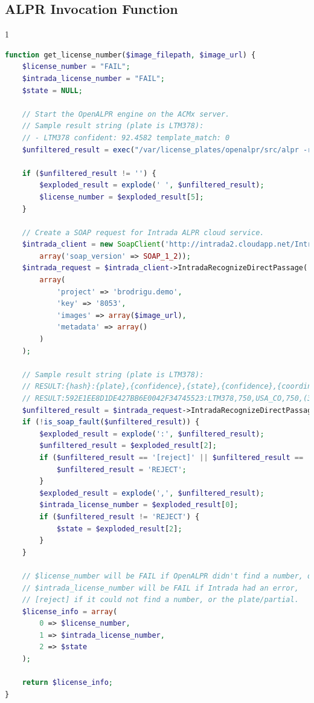 \documentclass[11pt, oneside, fullpage, doublespace]{article}
\begin{document}
\subsection*{ALPR Invocation Function}
\begin{spacing}{1}
\begin{lstlisting}[language=php]
function get_license_number($image_filepath, $image_url) {
	$license_number = "FAIL";
	$intrada_license_number = "FAIL";
	$state = NULL;

	// Start the OpenALPR engine on the ACMx server.
	// Sample result string (plate is LTM378):
	// - LTM378 confident: 92.4582 template_match: 0
	$unfiltered_result = exec("/var/license_plates/openalpr/src/alpr -r /var/license_plates/openalpr/runtime_data -n 1 $image_filepath");

	if ($unfiltered_result != '') {
		$exploded_result = explode(' ', $unfiltered_result);
		$license_number = $exploded_result[5];
	}

	// Create a SOAP request for Intrada ALPR cloud service.
	$intrada_client = new SoapClient('http://intrada2.cloudapp.net/IntradaService.asmx?WSDL',
		array('soap_version' => SOAP_1_2));
	$intrada_request = $intrada_client->IntradaRecognizeDirectPassage(
		array(
			'project' => 'brodrigu.demo',
			'key' => '8053',
			'images' => array($image_url),
			'metadata' => array()
		)
	);

	// Sample result string (plate is LTM378):
	// RESULT:{hash}:{plate},{confidence},{state},{confidence},{coordinates of license plate in image}:{execution time}
	// RESULT:592E1EE8D1DE427BB6E0042F34745523:LTM378,750,USA_CO,750,(309,156),(503,159),(309,206),(503,207):1594
	$unfiltered_result = $intrada_request->IntradaRecognizeDirectPassageResult;
	if (!is_soap_fault($unfiltered_result)) {
		$exploded_result = explode(':', $unfiltered_result);
		$unfiltered_result = $exploded_result[2];
		if ($unfiltered_result == '[reject]' || $unfiltered_result == 'Could not download file') {
			$unfiltered_result = 'REJECT';
		}
		$exploded_result = explode(',', $unfiltered_result);
		$intrada_license_number = $exploded_result[0];
		if ($unfiltered_result != 'REJECT') {
			$state = $exploded_result[2];
		}
	}

	// $license_number will be FAIL if OpenALPR didn't find a number, or the plate/partial.
	// $intrada_license_number will be FAIL if Intrada had an error,
	// [reject] if it could not find a number, or the plate/partial.
	$license_info = array(
		0 => $license_number,
		1 => $intrada_license_number,
		2 => $state
	);

	return $license_info;
}
\end{lstlisting}
\end{spacing}
\end{document}
